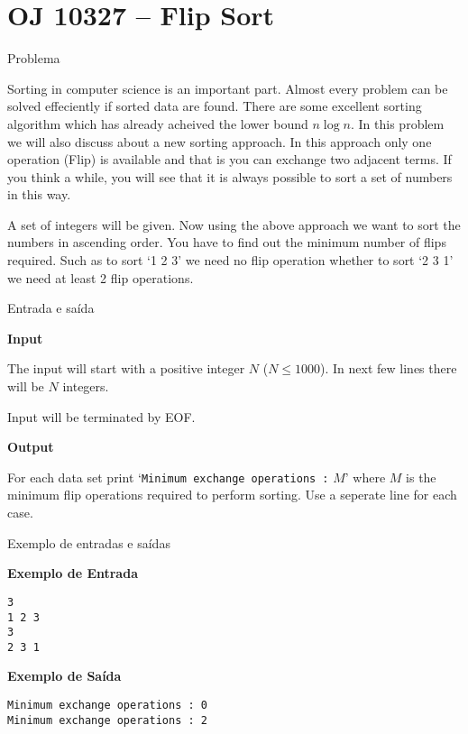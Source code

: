 \section{OJ 10327 -- Flip Sort}

\begin{frame}[fragile]{Problema}

Sorting in computer science is an important part. Almost every problem can be solved effeciently if
sorted data are found. There are some excellent sorting algorithm which has already acheived the 
lower bound $n\log n$. In this problem we will also discuss about a new sorting approach. In this 
approach only one operation (Flip) is available and that is you can exchange two adjacent terms. 
If you think a while, you will see that it is always possible to sort a set of numbers in this way.

A set of integers will be given. Now using the above approach we want to sort the numbers in
ascending order. You have to find out the minimum number of flips required. Such as to sort 
‘1 2 3’ we need no flip operation whether to sort ‘2 3 1’ we need at least 2 flip operations.

\end{frame}

\begin{frame}[fragile]{Entrada e saída}

\textbf{Input}

The input will start with a positive integer $N$ ($N\leq 1000$). In next few lines there will be 
$N$ integers.  

Input will be terminated by EOF.

\vspace{0.1in}

\textbf{Output}

For each data set print ‘\texttt{Minimum exchange operations :} $M$’ where $M$ is the minimum 
flip operations required to perform sorting. Use a seperate line for each case.

\end{frame}

\begin{frame}[fragile]{Exemplo de entradas e saídas}

\begin{minipage}[t]{0.4\textwidth}
\textbf{Exemplo de Entrada}
\begin{verbatim}
3
1 2 3
3
2 3 1
\end{verbatim}
\end{minipage}
\begin{minipage}[t]{0.55\textwidth}
\textbf{Exemplo de Saída}
\begin{verbatim}
Minimum exchange operations : 0
Minimum exchange operations : 2
\end{verbatim}
\end{minipage}
\end{frame}

